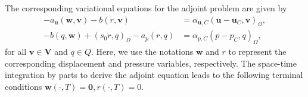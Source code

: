\documentclass{amsart}
\newcommand{\LRp}[1]{\left( #1 \right)}
\begin{document}
The corresponding variational equations for the adjoint problem are given by
\begin{subequations}\label{eq:new-weakadj}
	\begin{align*}
		-a_{\boldsymbol{u}} (\dot{\boldsymbol{w}}, \boldsymbol{v}) - b(\dot{r},\boldsymbol{v}) &=  \alpha_{\boldsymbol{u}, C} ( \boldsymbol{u}-\boldsymbol{u}_C, \boldsymbol{v} )_{\Omega}, \\
		-b(q,\dot{\boldsymbol{w}}) + (s_0 \dot{r}, q)_{\Omega} - a_p (r, q) &= \alpha_{p, C}( p-p_C, q)_{\Omega},
	\end{align*}
\end{subequations}
for all $\boldsymbol{v} \in \boldsymbol{V}$ and $q\in Q$. Here, we use the notations $\boldsymbol{w}$ and $r$ to represent the corresponding displacement and pressure variables, respectively. The space-time integration by parts to derive the adjoint equation leads to the following terminal conditions ${\boldsymbol{w}}(\cdot,T) = \boldsymbol{0}, {r}(\cdot,T) = 0$. 
\end{document}
